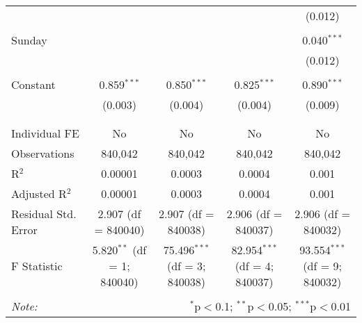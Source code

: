 \documentclass[
]{article}
\begin{document}
\begin{table}[!htbp]
{\begin{tabular}{@{\extracolsep{5pt}}lcccc}
  &  &  &  & (0.012) \\ 
  & & & & \\ 
 Sunday &  &  &  & 0.040$^{***}$ \\ 
  &  &  &  & (0.012) \\ 
  & & & & \\ 
 Constant & 0.859$^{***}$ & 0.850$^{***}$ & 0.825$^{***}$ & 0.890$^{***}$ \\ 
  & (0.003) & (0.004) & (0.004) & (0.009) \\ 
  & & & & \\ 
\hline \\[-1.8ex] 
Individual FE & No & No & No & No \\ 
Observations & 840,042 & 840,042 & 840,042 & 840,042 \\ 
R$^{2}$ & 0.00001 & 0.0003 & 0.0004 & 0.001 \\ 
Adjusted R$^{2}$ & 0.00001 & 0.0003 & 0.0004 & 0.001 \\ 
Residual Std. Error & 2.907 (df = 840040) & 2.907 (df = 840038) & 2.906 (df = 840037) & 2.906 (df = 840032) \\ 
F Statistic & 5.820$^{**}$ (df = 1; 840040) & 75.496$^{***}$ (df = 3; 840038) & 82.954$^{***}$ (df = 4; 840037) & 93.554$^{***}$ (df = 9; 840032) \\ 
\hline 
\hline \\[-1.8ex] 
\textit{Note:}  & \multicolumn{4}{r}{$^{*}$p$<$0.1; $^{**}$p$<$0.05; $^{***}$p$<$0.01} \\ 
\end{tabular}
} 
\end{table} 
\newpage
\end{document}
